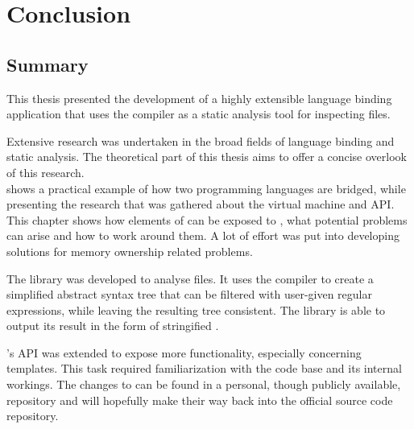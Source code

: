 \part{\hspace{5pt}Conclusion}
\chapter{Summary}
\label{chap:Summary}



This thesis presented the development of a highly extensible language binding application that uses the  compiler as a static analysis tool for inspecting  files.

Extensive research was undertaken in the broad fields of language binding and static analysis. The theoretical part of this thesis aims to offer a concise overlook of this research.\\
 shows a practical example of how two programming languages are bridged, while presenting the research that was gathered about the   virtual machine and API. This chapter shows how elements of  can be exposed to , what potential problems can arise and how to work around them. A lot of effort was put into developing solutions for memory ownership related problems.

The  library was developed to analyse  files. It uses the  compiler to create a simplified abstract syntax tree that can be filtered with user-given regular expressions, while leaving the resulting tree consistent. The library is able to output its result in the form of stringified .

's  API was extended to expose more  functionality, especially concerning  templates. This task required familiarization with the  code base and its internal workings. The changes to  can be found in a personal, though publicly available,  repository and will hopefully make their way back into the official  source code repository.

